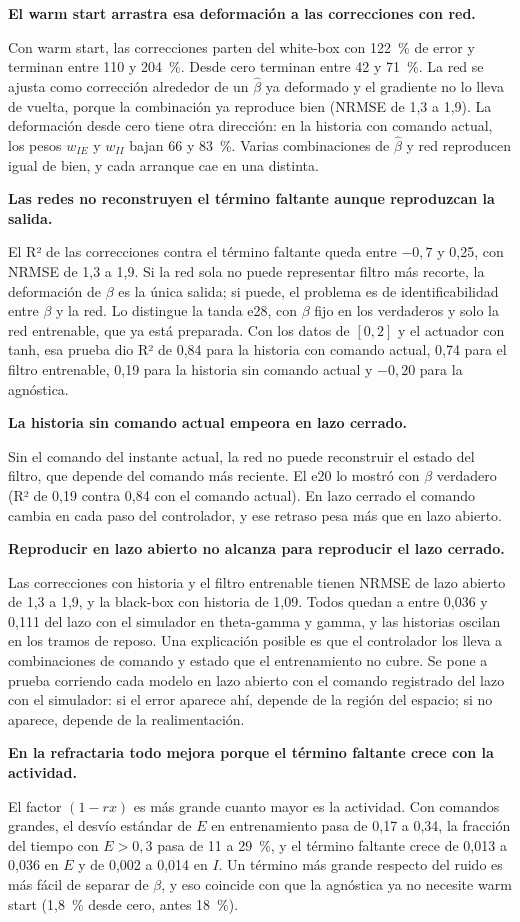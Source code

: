 \documentclass[10pt,a4paper]{article}
\newcommand{\bh}{\hat\beta}
\newcommand{\hip}[1]{\par\smallskip\textbf{#1}\par}
\begin{document}
\hip{El warm start arrastra esa deformación a las correcciones con red.}
Con warm start, las correcciones parten del white-box con 122~\% de error y terminan entre 110 y 204~\%. Desde cero terminan entre 42 y 71~\%. La red se ajusta como corrección alrededor de un $\bh$ ya deformado y el gradiente no lo lleva de vuelta, porque la combinación ya reproduce bien (NRMSE de 1,3 a 1,9). La deformación desde cero tiene otra dirección: en la historia con comando actual, los pesos $w_{IE}$ y $w_{II}$ bajan 66 y 83~\%. Varias combinaciones de $\bh$ y red reproducen igual de bien, y cada arranque cae en una distinta.

\hip{Las redes no reconstruyen el término faltante aunque reproduzcan la salida.}
El R² de las correcciones contra el término faltante queda entre $-0{,}7$ y 0,25, con NRMSE de 1,3 a 1,9. Si la red sola no puede representar filtro más recorte, la deformación de $\beta$ es la única salida; si puede, el problema es de identificabilidad entre $\beta$ y la red. Lo distingue la tanda e28, con $\beta$ fijo en los verdaderos y solo la red entrenable, que ya está preparada. Con los datos de $[0, 2]$ y el actuador con tanh, esa prueba dio R² de 0,84 para la historia con comando actual, 0,74 para el filtro entrenable, 0,19 para la historia sin comando actual y $-0{,}20$ para la agnóstica.

\hip{La historia sin comando actual empeora en lazo cerrado.}
Sin el comando del instante actual, la red no puede reconstruir el estado del filtro, que depende del comando más reciente. El e20 lo mostró con $\beta$ verdadero (R² de 0,19 contra 0,84 con el comando actual). En lazo cerrado el comando cambia en cada paso del controlador, y ese retraso pesa más que en lazo abierto.

\hip{Reproducir en lazo abierto no alcanza para reproducir el lazo cerrado.}
Las correcciones con historia y el filtro entrenable tienen NRMSE de lazo abierto de 1,3 a 1,9, y la black-box con historia de 1,09. Todos quedan a entre 0,036 y 0,111 del lazo con el simulador en theta-gamma y gamma, y las historias oscilan en los tramos de reposo. Una explicación posible es que el controlador los lleva a combinaciones de comando y estado que el entrenamiento no cubre. Se pone a prueba corriendo cada modelo en lazo abierto con el comando registrado del lazo con el simulador: si el error aparece ahí, depende de la región del espacio; si no aparece, depende de la realimentación.

\hip{En la refractaria todo mejora porque el término faltante crece con la actividad.}
El factor $(1 - r x)$ es más grande cuanto mayor es la actividad. Con comandos grandes, el desvío estándar de $E$ en entrenamiento pasa de 0,17 a 0,34, la fracción del tiempo con $E > 0{,}3$ pasa de 11 a 29~\%, y el término faltante crece de 0,013 a 0,036 en $E$ y de 0,002 a 0,014 en $I$. Un término más grande respecto del ruido es más fácil de separar de $\beta$, y eso coincide con que la agnóstica ya no necesite warm start (1,8~\% desde cero, antes 18~\%).
\end{document}

